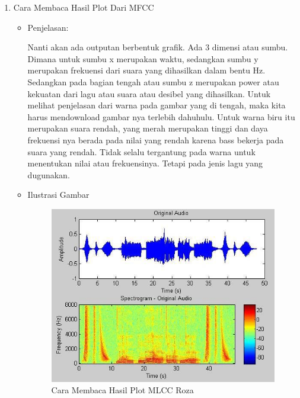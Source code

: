 \begin{enumerate}
\item Cara Membaca Hasil Plot Dari MFCC
\begin{itemize}
\item Penjelasan:
\par Nanti akan ada outputan berbentuk grafik. Ada 3 dimensi atau sumbu. Dimana untuk sumbu x merupakan waktu, sedangkan sumbu y merupakan frekuensi dari suara yang dihasilkan dalam bentu Hz. Sedangkan pada bagian tengah atau sumbu z merupakan power atau kekuatan dari lagu atau suara atau desibel yang dihasilkan. Untuk melihat penjelasan dari warna pada gambar yang di tengah, maka kita harus mendownload gambar nya terlebih dahuhulu. Untuk warna biru itu merupakan suara rendah, yang merah merupakan tinggi dan daya frekuensi nya berada pada nilai yang rendah karena bass bekerja pada suara yang rendah. Tidak selalu tergantung pada warna untuk menentukan nilai atau frekuensinya. Tetapi pada jenis lagu yang dugunakan. 
\par
\item Ilustrasi Gambar
\begin{figure}[!hbtp]
\centering
\includegraphics[scale=0.5]{figures/caramembacaroza.jpg}
\caption{Cara Membaca Hasil Plot MLCC Roza}
\label{text-fadila}
\end{figure}
\par
\end{itemize}
\par
\par




\end{enumerate}
